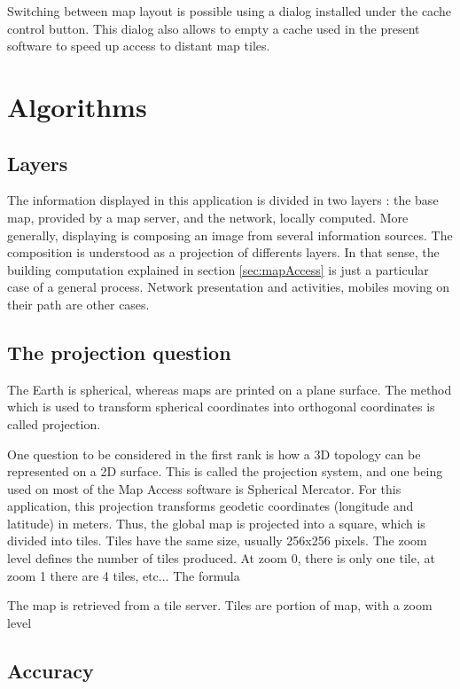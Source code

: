 Switching between map layout is possible using a dialog installed 
under the cache control button. This dialog also allows to empty a cache 
used in the present software to speed up access to distant map tiles. 


\section{Algorithms}

\subsection{Layers}

The information displayed in this application is divided in two layers : the base map, 
provided by a map server, and the network, locally computed. 
More generally, displaying is composing an image from several information sources. 
The composition is understood as a projection of differents layers. 
In that sense, the building computation explained in section \ref{sec:mapAccess}
is just a particular case of a general process. 
Network presentation and activities, mobiles moving on their path are other cases.

\subsection{The projection question}

The Earth is spherical, whereas maps are printed on a plane surface. 
The method which is used to transform spherical coordinates into orthogonal coordinates 
is called projection. 



One question to be considered in the first rank is how a 3D topology can be represented 
on a 2D surface. This is called the projection system, and one being used on most of the 
Map Access software is Spherical Mercator. 
For this application, this projection transforms geodetic coordinates (longitude and latitude) 
in meters. Thus, the global map is projected into a square, which is divided into tiles. 
Tiles have the same size, usually 256x256 pixels. The zoom level defines the number of tiles produced. 
At zoom 0, there is only one tile, at zoom 1 there are 4 tiles, etc... 
The formula 

The map is retrieved from a tile server. Tiles are portion of map, with a zoom level

\subsection{Accuracy}

